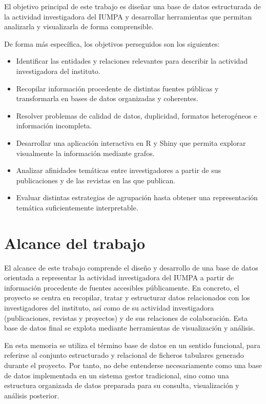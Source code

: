 \documentclass[11pt,spanish,listoffigures,listoftables]{tfgetsinf}
\begin{document}
El objetivo principal de este trabajo es diseñar una base de datos estructurada de la actividad investigadora del IUMPA y desarrollar herramientas que permitan analizarla y visualizarla de forma comprensible.

De forma más específica, los objetivos perseguidos son los siguientes:

\begin{itemize}
    \item Identificar las entidades y relaciones relevantes para describir la actividad investigadora del instituto.
    \item Recopilar información procedente de distintas fuentes públicas y transformarla en bases de datos organizadas y coherentes.
    \item Resolver problemas de calidad de datos, duplicidad, formatos heterogéneos e información incompleta.
    \item Desarrollar una aplicación interactiva en R y Shiny que permita explorar visualmente la información mediante grafos.
    \item Analizar afinidades temáticas entre investigadores a partir de sus publicaciones y de las revistas en las que publican.
    \item Evaluar distintas estrategias de agrupación hasta obtener una representación temática suficientemente interpretable.
\end{itemize}

\section{Alcance del trabajo}

El alcance de este trabajo comprende el diseño y desarrollo de una base de datos orientada a representar la actividad investigadora del IUMPA a partir de información procedente de fuentes accesibles públicamente. En concreto, el proyecto se centra en recopilar, tratar y estructurar datos relacionados con los investigadores del instituto, así como de su actividad investigadora (publicaciones, revistas y proyectos) y de sus relaciones de colaboración. Esta base de datos final se explota mediante herramientas de visualización y análisis.

En esta memoria se utiliza el término base de datos en un sentido funcional, para referirse al conjunto estructurado y relacional de ficheros tabulares generado durante el proyecto. Por tanto, no debe entenderse necesariamente como una base de datos implementada en un sistema gestor tradicional, sino como una estructura organizada de datos preparada para su consulta, visualización y análisis posterior.
\end{document}
